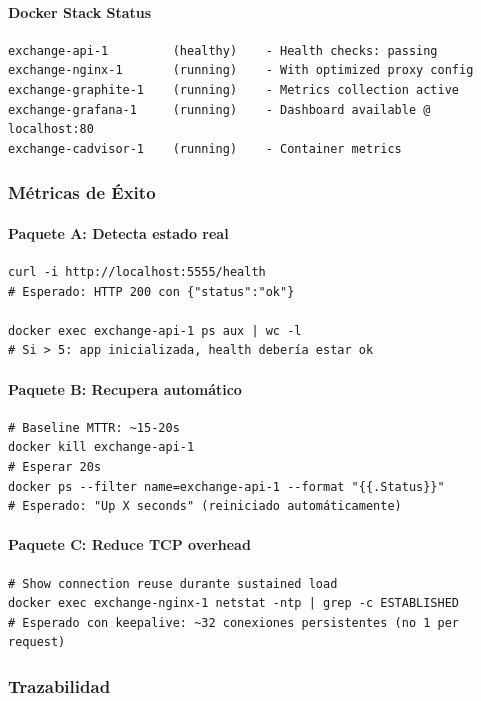\paragraph{Docker Stack Status}
\begin{verbatim}
exchange-api-1         (healthy)    - Health checks: passing
exchange-nginx-1       (running)    - With optimized proxy config
exchange-graphite-1    (running)    - Metrics collection active
exchange-grafana-1     (running)    - Dashboard available @ localhost:80
exchange-cadvisor-1    (running)    - Container metrics
\end{verbatim}

\subsubsection{Métricas de Éxito}

\paragraph{Paquete A: Detecta estado real}
\begin{verbatim}
curl -i http://localhost:5555/health
# Esperado: HTTP 200 con {"status":"ok"}

docker exec exchange-api-1 ps aux | wc -l
# Si > 5: app inicializada, health debería estar ok
\end{verbatim}

\paragraph{Paquete B: Recupera automático}
\begin{verbatim}
# Baseline MTTR: ~15-20s
docker kill exchange-api-1
# Esperar 20s
docker ps --filter name=exchange-api-1 --format "{{.Status}}"
# Esperado: "Up X seconds" (reiniciado automáticamente)
\end{verbatim}

\paragraph{Paquete C: Reduce TCP overhead}
\begin{verbatim}
# Show connection reuse durante sustained load
docker exec exchange-nginx-1 netstat -ntp | grep -c ESTABLISHED
# Esperado con keepalive: ~32 conexiones persistentes (no 1 per request)
\end{verbatim}

\subsubsection{Trazabilidad}


